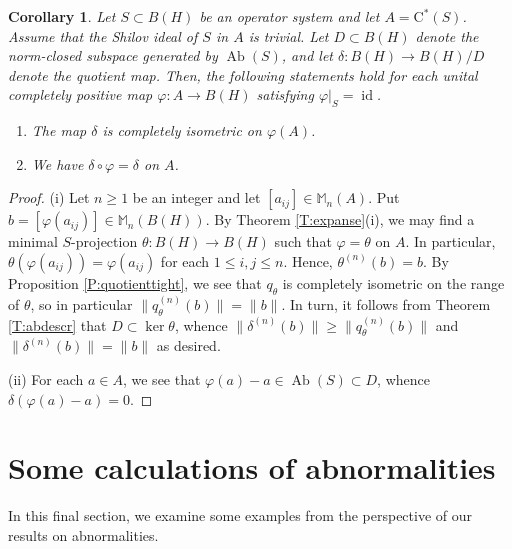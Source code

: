 \documentclass[10pt]{amsart}
\newcommand{\bM}{{\mathbb{M}}}
\newcommand{\rC}{\mathrm{C}}
\renewcommand{\phi}{\varphi}
\newcommand{\Ab}{\operatorname{Ab}}
\newcommand{\id}{\operatorname{id}}
\newtheorem{corollary}[lemma]{Corollary}
\theoremstyle{definition}
\begin{document}
\begin{corollary}\label{C:uepquotient}
Let $S\subset B(H)$ be an operator system and let $A=\rC^*(S)$. Assume that the Shilov ideal of $S$ in $A$ is trivial. Let $D\subset B(H)$ denote the norm-closed subspace generated by $\Ab (S)$, and let $\delta:B(H)\to B(H)/D$ denote the quotient map. Then, the following statements hold for each unital completely positive map $\phi:A\to B(H)$ satisfying $\phi|_S=\id$.
\begin{enumerate}[{\rm (i)}]
\item The map $\delta$ is completely isometric on $\phi(A)$.
\item We have $\delta\circ \phi=\delta$ on $A$.
\end{enumerate}
\end{corollary}
\begin{proof}
(i)  Let $n\geq 1$ be an integer and let $[a_{ij}]\in \bM_n(A)$. Put $b=[\phi(a_{ij})]\in \bM_n(B(H))$. By Theorem  \ref{T:expanse}(i), we may find a minimal $S$-projection $\theta:B(H)\to B(H)$ such that $\phi=\theta$ on $A$. In particular, $\theta(\phi(a_{ij}))=\phi(a_{ij})$ for each $1\leq i,j\leq n$. Hence, $\theta^{(n)}(b)=b$. By Proposition \ref{P:quotienttight}, we see that $q_\theta$ is completely isometric on the range of $\theta$, so in particular
$
\|q_\theta^{(n)}(b)\|=\|b\|.
$
In turn,  it follows from Theorem \ref{T:abdescr} that $D\subset \ker \theta$, whence $\|\delta^{(n)}(b)\|\geq \|q_\theta^{(n)}(b)\|$ and $\|\delta^{(n)}(b)\|=\|b\|$ as desired.

(ii) For each $a\in A$, we see that $\phi(a)-a\in \Ab(S)\subset D$, whence $\delta(\phi(a)-a)=0$.
\end{proof}




\section{Some calculations of abnormalities}\label{S:example}
In this final section, we examine some examples from the perspective of our results on abnormalities.
\end{document}
